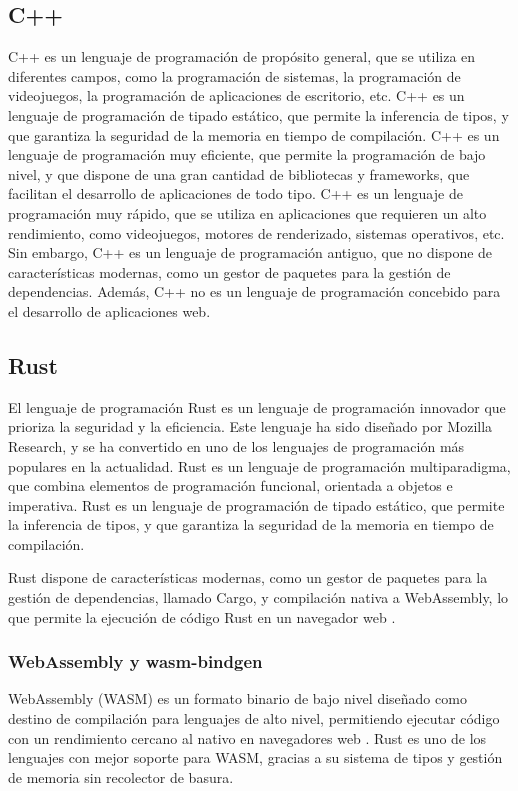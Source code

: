 \subsection{C++}
C++ es un lenguaje de programación de propósito general, que se utiliza en diferentes campos, como la programación de sistemas, la programación de videojuegos, la programación de aplicaciones de escritorio, etc. C++ es un lenguaje de programación de tipado estático, que permite la inferencia de tipos, y que garantiza la seguridad de la memoria en tiempo de compilación. C++ es un lenguaje de programación muy eficiente, que permite la programación de bajo nivel, y que dispone de una gran cantidad de bibliotecas y frameworks, que facilitan el desarrollo de aplicaciones de todo tipo. C++ es un lenguaje de programación muy rápido, que se utiliza en aplicaciones que requieren un alto rendimiento, como videojuegos, motores de renderizado, sistemas operativos, etc. Sin embargo, C++ es un lenguaje de programación antiguo, que no dispone de características modernas, como un gestor de paquetes para la gestión de dependencias. Además, C++ no es un lenguaje de programación concebido para el desarrollo de aplicaciones web.

\subsection{Rust}
El lenguaje de programación Rust es un lenguaje de programación innovador que prioriza la seguridad y la eficiencia. Este lenguaje ha sido diseñado por Mozilla Research, y se ha convertido en uno de los lenguajes de programación más populares en la actualidad. Rust es un lenguaje de programación multiparadigma, que combina elementos de programación funcional, orientada a objetos e imperativa. Rust es un lenguaje de programación de tipado estático, que permite la inferencia de tipos, y que garantiza la seguridad de la memoria en tiempo de compilación. 

Rust dispone de características modernas, como un gestor de paquetes para la gestión de dependencias, llamado Cargo, y compilación nativa a WebAssembly, lo que permite la ejecución de código Rust en un navegador web \autocite{WebAssembly}.

\subsubsection{WebAssembly y wasm-bindgen}

WebAssembly (WASM) es un formato binario de bajo nivel diseñado como destino de compilación para lenguajes de alto nivel, permitiendo ejecutar código con un rendimiento cercano al nativo en navegadores web \autocite{WebAssembly}. Rust es uno de los lenguajes con mejor soporte para WASM, gracias a su sistema de tipos y gestión de memoria sin recolector de basura.

